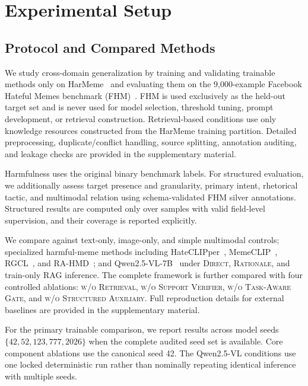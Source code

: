 \section{Experimental Setup}
\label{sec:setup}

\subsection{Protocol and Compared Methods}
\label{sec:setup:protocol}

We study cross-domain generalization by training and validating
trainable methods only on HarMeme~\cite{pramanick2021harmeme,pramanick2021momenta}
and evaluating them on the 9,000-example Facebook Hateful Memes benchmark
(FHM)~\cite{kiela2020hateful}.
FHM is used exclusively as the held-out target set and is never used
for model selection, threshold tuning, prompt development, or
retrieval construction.
Retrieval-based conditions use only knowledge resources constructed
from the HarMeme training partition.
Detailed preprocessing, duplicate/conflict handling, source splitting,
annotation auditing, and leakage checks are provided in the
supplementary material.

Harmfulness uses the original binary benchmark labels.
For structured evaluation, we additionally assess target presence and
granularity, primary intent, rhetorical tactic, and multimodal relation
using schema-validated FHM silver annotations.
Structured results are computed only over samples with valid
field-level supervision, and their coverage is reported explicitly.

We compare against text-only, image-only, and simple multimodal
controls; specialized harmful-meme methods including
HateCLIPper~\cite{kumar2022hateclipper},
MemeCLIP~\cite{shah2024memeclip}, RGCL~\cite{mei2024rgcl}, and
RA-HMD~\cite{mei2025rahmd};
and Qwen2.5-VL-7B~\cite{bai2025qwen25vl} under
\textsc{Direct}, \textsc{Rationale}, and train-only \textsc{RAG}
inference.
The complete framework is further compared with four controlled
ablations: \textsc{w/o Retrieval}, \textsc{w/o Support Verifier},
\textsc{w/o Task-Aware Gate}, and
\textsc{w/o Structured Auxiliary}.
Full reproduction details for external baselines are provided in the
supplementary material.

For the primary trainable comparison, we report results across model
seeds $\{42,52,123,777,2026\}$ when the complete audited seed set is
available.
Core component ablations use the canonical seed 42.
The Qwen2.5-VL conditions use one locked deterministic run rather than
nominally repeating identical inference with multiple seeds.



